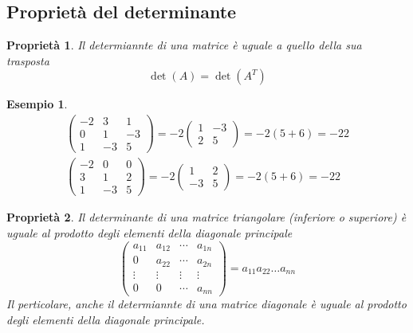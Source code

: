 \documentclass{book}
\theoremstyle{definition}
\newtheorem{es}{Esempio}[section]
\theoremstyle{plain}
\newtheorem{pro}{Proprietà}[section]
\begin{document}
\subsection{Proprietà del determinante}
\label{sec:prodeldet}
\begin{pro}
  \label{pro:prodeldet1}
  Il determiannte di una matrice è uguale a quello della sua trasposta
  \begin{equation*}
    \det(A)=\det(A^T)
  \end{equation*}
\end{pro}
\begin{es}
  \label{es:prodeldet1}
  \begin{eqnarray*}
    \begin{pmatrix}
      -2 & 3 & 1\\
      0 & 1 & -3\\
      1 & -3 & 5
    \end{pmatrix}=-2
    \begin{pmatrix}
      1 &-3\\
      2 & 5
    \end{pmatrix}= -2(5+6)=-22\\
    \begin{pmatrix}
      -2 & 0 & 0\\
      3 & 1 & 2 \\
      1 & -3 & 5
    \end{pmatrix}= -2
    \begin{pmatrix}
      1 & 2\\
      -3 & 5
    \end{pmatrix}=-2(5+6)=-22
  \end{eqnarray*}
\end{es}
\begin{pro}
  \label{pro:prodeldet2}
  Il determinante di una matrice triangolare (inferiore o superiore) è
  uguale al prodotto degli elementi della diagonale principale
  \begin{equation*}
    \begin{pmatrix}
      a_{11} & a_{12} & \cdots & a_{1n}\\
      0 & a_{22} & \cdots & a_{2n}\\
      \vdots & \vdots & \vdots & \vdots\\
      0 & 0 & \cdots & a_{nn}
    \end{pmatrix}=a_{11}a_{22}\dots a_{nn}
  \end{equation*}
  Il perticolare, anche il determiannte di una matrice diagonale è uguale
  al prodotto degli elementi della diagonale principale.
\end{pro}
\end{document}

